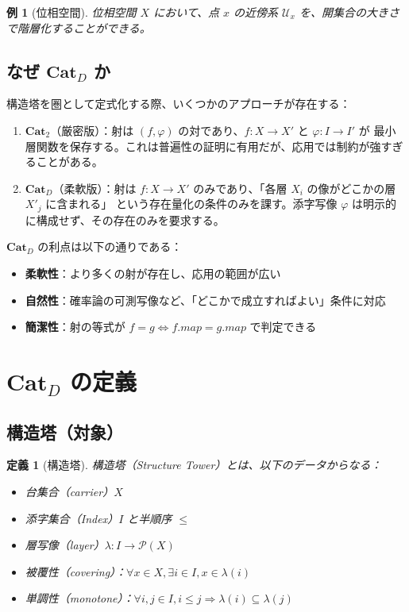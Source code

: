 \documentclass[a4paper,12pt]{ltjsarticle}
\newtheorem{definition}[theorem]{定義}
\newtheorem{example}[theorem]{例}
\begin{document}
\begin{example}[位相空間]
位相空間 $X$ において、点 $x$ の近傍系 $\mathcal{U}_x$ を、開集合の大きさで階層化することができる。
\end{example}

\subsection{なぜ $\mathbf{Cat}_D$ か}

構造塔を圏として定式化する際、いくつかのアプローチが存在する：

\begin{enumerate}
  \item \textbf{$\mathbf{Cat}_2$}（厳密版）：射は $(f, \varphi)$ の対であり、$f: X \to X'$ と $\varphi: I \to I'$ が
    最小層関数を保存する。これは普遍性の証明に有用だが、応用では制約が強すぎることがある。

  \item \textbf{$\mathbf{Cat}_D$}（柔軟版）：射は $f: X \to X'$ のみであり、「各層 $X_i$ の像がどこかの層 $X'_j$ に含まれる」
    という存在量化の条件のみを課す。添字写像 $\varphi$ は明示的に構成せず、その存在のみを要求する。
\end{enumerate}

$\mathbf{Cat}_D$ の利点は以下の通りである：

\begin{itemize}
  \item \textbf{柔軟性}：より多くの射が存在し、応用の範囲が広い
  \item \textbf{自然性}：確率論の可測写像など、「どこかで成立すればよい」条件に対応
  \item \textbf{簡潔性}：射の等式が $f = g \iff f.map = g.map$ で判定できる
\end{itemize}

\section{$\mathbf{Cat}_D$ の定義}

\subsection{構造塔（対象）}

\begin{definition}[構造塔]
\label{def:tower}
構造塔（Structure Tower）とは、以下のデータからなる：
\begin{itemize}
  \item 台集合（carrier）$X$
  \item 添字集合（Index）$I$ と半順序 $\leq$
  \item 層写像（layer）$\lambda: I \to \mathcal{P}(X)$
  \item 被覆性（covering）：$\forall x \in X, \exists i \in I, x \in \lambda(i)$
  \item 単調性（monotone）：$\forall i, j \in I, i \leq j \Rightarrow \lambda(i) \subseteq \lambda(j)$
\end{itemize}
\end{definition}
\end{document}
